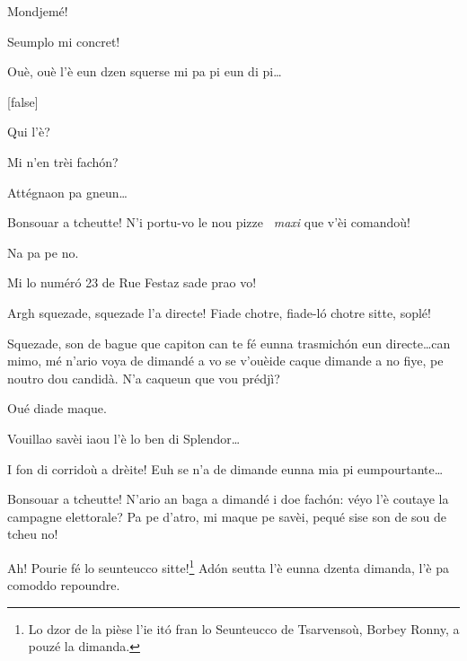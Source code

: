 \begin{drama}
\Brunospeaks {} Mondjemé!

\Jordyspeaks Seumplo mi concret!

\Brunospeaks Ouè, ouè l'è eun dzen squerse mi pa pi eun di pi\ldots

[false]

\Brunospeaks Qui l'è?

\Noteospeaks Mi n'en trèi fach\'on?

\Brunospeaks Attégnaon pa gneun\ldots


\Fattorinospeaks Bonsouar a tcheutte! N'i portu-vo le nou pizze \pizza\ \textit{maxi} que v'èi comandoù!

\Noteospeaks Na pa pe no.

\Fattorinospeaks Mi lo num\'er\'o 23 de Rue Festaz sade prao vo!

\Brunospeaks {} Argh squezade, squezade l'a directe!  Fiade chotre, fiade-l\'o chotre sitte, soplé!


\Brunospeaks {} Squezade, son de bague que capiton can te fé eunna trasmich\'on eun directe\ldots can mimo, mé n'ario voya de dimandé a vo se v'ouèide caque dimande a no fiye, pe noutro dou candidà. N'a caqueun que vou prédjì?


 \Brunospeaks {} Oué diade maque.

\SpectIspeaks Vouillao savèi iaou l'è lo ben di Splendor\ldots

\Brunospeaks I fon di corridoù a drèite! Euh se n'a de dimande eunna mia pi eumpourtante\ldots
 

\SpectIIspeaks Bonsouar a tcheutte! N'ario an baga a dimandé i doe fach\'on: véyo l'è coutaye la campagne elettorale? Pa pe d’atro, mi maque pe savèi, pequé sise son de sou de tcheu no!

\Brunospeaks Ah! Pourie fé lo seunteucco sitte!\footnote{ Lo dzor de la pièse l'ie it\'o fran lo Seunteucco de Tsarvensoù, Borbey Ronny, a pouzé la dimanda.}  Ad\'on seutta l'è eunna dzenta dimanda, l'è pa comoddo repoundre. 


\end{drama}

